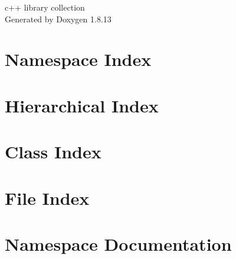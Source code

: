 \documentclass[twoside]{book}
\newcommand{\+}{\discretionary{\mbox{\scriptsize$\hookleftarrow$}}{}{}}
\newcommand{\clearemptydoublepage}{%
  \newpage{\pagestyle{empty}\cleardoublepage}%
}
\begin{document}
\hypersetup{pageanchor=false,
             bookmarksnumbered=true,
             pdfencoding=unicode
            }
\begin{titlepage}
\vspace*{7cm}
\begin{center}%
{\Large c++ library collection }\\
\vspace*{1cm}
{\large Generated by Doxygen 1.8.13}\\
\end{center}
\end{titlepage}
\clearemptydoublepage
{}
\tableofcontents
\clearemptydoublepage
{}
\hypersetup{pageanchor=true}

\chapter{Namespace Index}

\chapter{Hierarchical Index}

\chapter{Class Index}

\chapter{File Index}

\chapter{Namespace Documentation}







\end{document}

